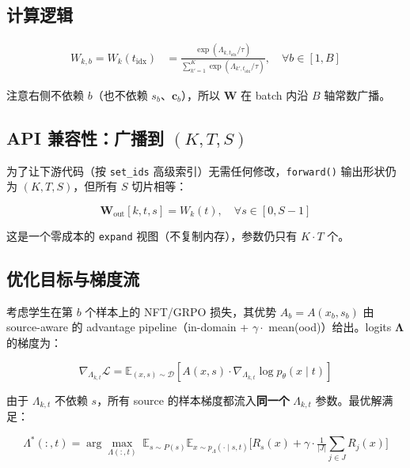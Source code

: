 \documentclass[11pt,a4paper]{article}
\begin{document}
\subsection{计算逻辑}

\begin{align}
W_{k,b} = W_k(t_{\text{idx}}) &= \frac{\exp(\Lambda_{k, t_{\text{idx}}} / \tau)}{\sum_{k'=1}^K \exp(\Lambda_{k', t_{\text{idx}}} / \tau)}, \quad \forall b \in [1, B]
\label{eq:lut_sa_weight}
\end{align}

注意右侧不依赖 $b$（也不依赖 $s_b$、$\mathbf{c}_b$），所以 $\mathbf{W}$ 在 batch 内沿 $B$ 轴常数广播。

\subsection{API 兼容性：广播到 $(K, T, S)$}

为了让下游代码（按 \texttt{set\_ids} 高级索引）无需任何修改，\texttt{forward()} 输出形状仍为 $(K, T, S)$，但所有 $S$ 切片相等：

\begin{equation}
\mathbf{W}_{\text{out}}[k, t, s] = W_k(t), \quad \forall s \in [0, S{-}1]
\end{equation}

这是一个零成本的 \texttt{expand} 视图（不复制内存），参数仍只有 $K \cdot T$ 个。

\subsection{优化目标与梯度流}

考虑学生在第 $b$ 个样本上的 NFT/GRPO 损失，其优势 $A_b = A(x_b, s_b)$ 由 source-aware 的 advantage pipeline（in-domain + $\gamma \cdot$ mean(ood)）给出。logits $\bm{\Lambda}$ 的梯度为：

\begin{equation}
\nabla_{\Lambda_{k,t}} \mathcal{L}
= \mathbb{E}_{(x, s) \sim \mathcal{D}} \left[
    A(x, s) \cdot \nabla_{\Lambda_{k,t}} \log p_\theta(x \mid t)
\right]
\label{eq:lut_sa_grad}
\end{equation}

由于 $\Lambda_{k,t}$ 不依赖 $s$，所有 source 的样本梯度都流入\textbf{同一个} $\Lambda_{k,t}$ 参数。最优解满足：

\begin{equation}
\Lambda^*(:, t) = \arg\max_{\Lambda(:, t)} \;
\mathbb{E}_{s \sim P(s)} \mathbb{E}_{x \sim p_\Lambda(\cdot \mid s, t)}
\bigl[ R_s(x) + \gamma \cdot \tfrac{1}{|J|}\textstyle\sum_{j \in J} R_j(x) \bigr]
\label{eq:lut_sa_optimal}
\end{equation}
\end{document}
